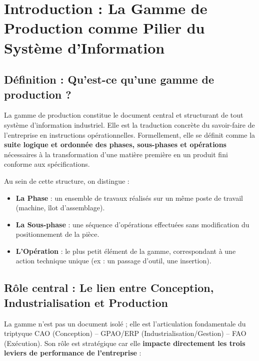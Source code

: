\documentclass{article}
\begin{document}

\section*{Introduction : La Gamme de Production comme Pilier du Système d'Information}

\subsection*{Définition : Qu'est-ce qu'une gamme de production ?}

La gamme de production constitue le document central et structurant de tout système d'information industriel. Elle est la traduction concrète du savoir-faire de l'entreprise en instructions opérationnelles. Formellement, elle se définit comme la \textbf{suite logique et ordonnée des phases, sous-phases et opérations} nécessaires à la transformation d'une matière première en un produit fini conforme aux spécifications.

Au sein de cette structure, on distingue :
\begin{itemize}
    \item \textbf{La Phase} : un ensemble de travaux réalisés sur un même poste de travail (machine, îlot d'assemblage).
    \item \textbf{La Sous-phase} : une séquence d'opérations effectuées sans modification du positionnement de la pièce.
    \item \textbf{L'Opération} : le plus petit élément de la gamme, correspondant à une action technique unique (ex : un passage d'outil, une insertion).
\end{itemize}

\subsection*{Rôle central : Le lien entre Conception, Industrialisation et Production}

La gamme n'est pas un document isolé ; elle est l'articulation fondamentale du triptyque CAO (Conception) – GPAO/ERP (Industrialisation/Gestion) – FAO (Exécution). Son rôle est stratégique car elle \textbf{impacte directement les trois leviers de performance de l'entreprise} :
\end{document}
